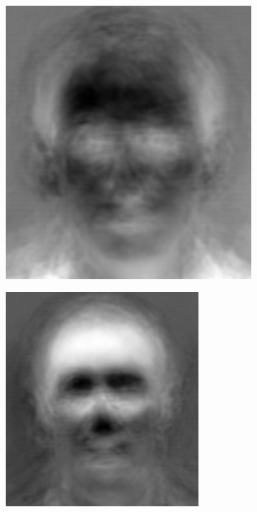 \begin{figure}
\begin{subfigure}[b]{0.3\textwidth}
\includegraphics[width=\textwidth]{figures/eigenface0.pdf}
\end{subfigure}
\begin{subfigure}[b]{0.3\textwidth}
\includegraphics[width=\textwidth]{figures/eigenface1.pdf}

\end{subfigure}
\end{figure}
